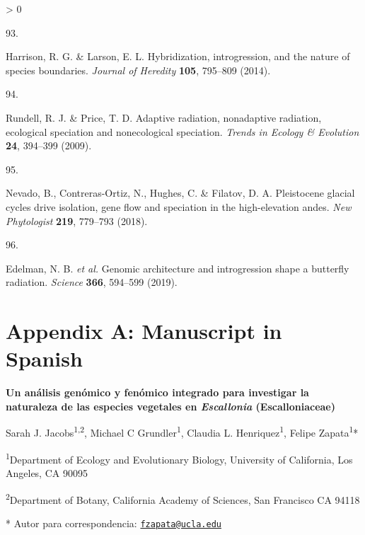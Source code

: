 \documentclass[
  11pt,
]{article}
\newlength{\cslhangindent}
\newlength{\csllabelwidth}
\newenvironment{CSLReferences}[2] %
 {%
  \setlength{\parindent}{0pt}
  \ifodd #1 \everypar{\setlength{\hangindent}{\cslhangindent}}\ignorespaces\fi
  \ifnum #2 > 0
  \setlength{\parskip}{#2\baselineskip}
  \fi
 }%
 {}
\newcommand{\CSLLeftMargin}[1]{\parbox[t]{\csllabelwidth}{#1}}
\newcommand{\CSLRightInline}[1]{\parbox[t]{\linewidth - \csllabelwidth}{#1}\break}
\begin{document}
\begin{CSLReferences}{0}{0}
\leavevmode\hypertarget{ref-harrison2014hybridization}{}%
\CSLLeftMargin{93. }
\CSLRightInline{Harrison, R. G. \& Larson, E. L. Hybridization, introgression, and the nature of species boundaries. \emph{Journal of Heredity} \textbf{105}, 795--809 (2014).}

\leavevmode\hypertarget{ref-rundell2009adaptive}{}%
\CSLLeftMargin{94. }
\CSLRightInline{Rundell, R. J. \& Price, T. D. Adaptive radiation, nonadaptive radiation, ecological speciation and nonecological speciation. \emph{Trends in Ecology \& Evolution} \textbf{24}, 394--399 (2009).}

\leavevmode\hypertarget{ref-nevado2018pleistocene}{}%
\CSLLeftMargin{95. }
\CSLRightInline{Nevado, B., Contreras-Ortiz, N., Hughes, C. \& Filatov, D. A. Pleistocene glacial cycles drive isolation, gene flow and speciation in the high-elevation andes. \emph{New Phytologist} \textbf{219}, 779--793 (2018).}

\leavevmode\hypertarget{ref-edelman2019genomic}{}%
\CSLLeftMargin{96. }
\CSLRightInline{Edelman, N. B. \emph{et al.} Genomic architecture and introgression shape a butterfly radiation. \emph{Science} \textbf{366}, 594--599 (2019).}

\end{CSLReferences}

\pagebreak

\hypertarget{appendix-appendix}{%
\appendix}


\hypertarget{appendix-a-manuscript-in-spanish}{%
\section{Appendix A: Manuscript in Spanish}\label{appendix-a-manuscript-in-spanish}}

\textbf{Un análisis genómico y fenómico integrado para investigar la naturaleza de las especies vegetales en \emph{Escallonia} (Escalloniaceae)}

Sarah J. Jacobs\textsuperscript{1,2}, Michael C Grundler\textsuperscript{1}, Claudia L. Henriquez\textsuperscript{1}, Felipe Zapata\textsuperscript{1}*

\textsuperscript{1}Department of Ecology and Evolutionary Biology, University of California, Los Angeles, CA 90095

\textsuperscript{2}Department of Botany, California Academy of Sciences, San Francisco CA 94118

* Autor para correspondencia: \href{mailto:fzapata@ucla.edu}{\nolinkurl{fzapata@ucla.edu}}
\end{document}
